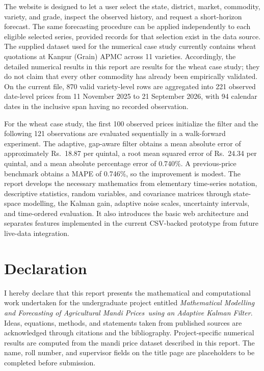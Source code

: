\documentclass[12pt,a4paper,oneside]{report}
\newcommand{\projecttitle}{Mathematical Modelling and Forecasting of Agricultural Mandi Prices\ using an Adaptive Kalman Filter}
\numberwithin{equation}{chapter}
\numberwithin{figure}{chapter}
\numberwithin{table}{chapter}
\theoremstyle{definition}
\theoremstyle{plain}
\newcommand{\1}{\mathbf{1}}
\begin{document}
The website is designed to let a user select the state, district, market, commodity, variety, and grade, inspect the observed history, and request a short-horizon forecast. The same forecasting procedure can be applied independently to each eligible selected series, provided records for that selection exist in the data source. The supplied dataset used for the numerical case study currently contains wheat quotations at Kanpur (Grain) APMC across 11 varieties. Accordingly, the detailed numerical results in this report are results for the wheat case study; they do not claim that every other commodity has already been empirically validated. On the current file, 870 valid variety-level rows are aggregated into 221 observed date-level prices from 11 November 2025 to 21 September 2026, with 94 calendar dates in the inclusive span having no recorded observation.

For the wheat case study, the first 100 observed prices initialize the filter and the following 121 observations are evaluated sequentially in a walk-forward experiment. The adaptive, gap-aware filter obtains a mean absolute error of approximately Rs.\ 18.87 per quintal, a root mean squared error of Rs.\ 24.34 per quintal, and a mean absolute percentage error of 0.740\%. A previous-price benchmark obtains a MAPE of 0.746\%, so the improvement is modest. The report develops the necessary mathematics from elementary time-series notation, descriptive statistics, random variables, and covariance matrices through state-space modelling, the Kalman gain, adaptive noise scales, uncertainty intervals, and time-ordered evaluation. It also introduces the basic web architecture and separates features implemented in the current CSV-backed prototype from future live-data integration.

\clearpage
\chapter*{Declaration}
I hereby declare that this report presents the mathematical and computational work undertaken for the undergraduate project entitled \emph{\projecttitle}. Ideas, equations, methods, and statements taken from published sources are acknowledged through citations and the bibliography. Project-specific numerical results are computed from the mandi price dataset described in this report. The name, roll number, and supervisor fields on the title page are placeholders to be completed before submission.
\end{document}
